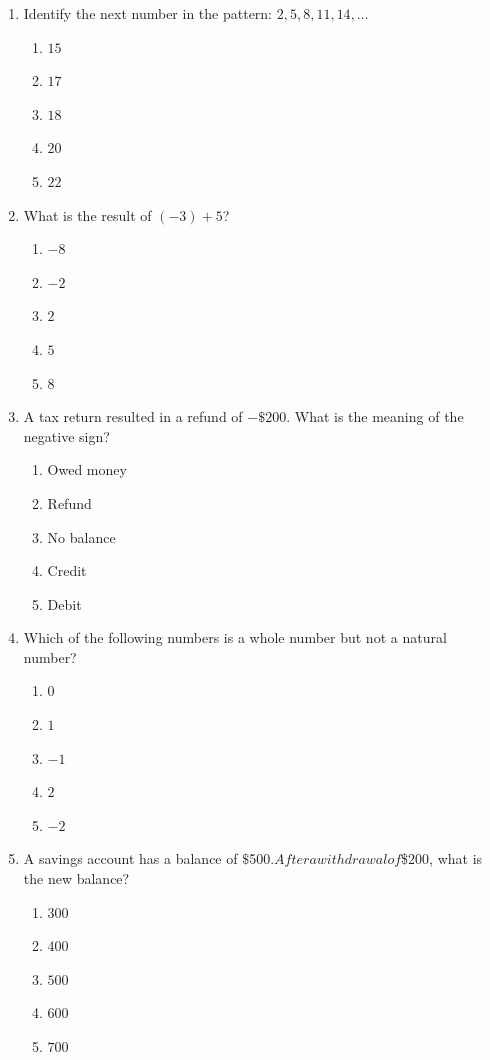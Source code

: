 \documentclass[10pt]{article}
\begin{document}
\begin{multicols}{2}
\begin{enumerate}[label=\textbf{Q\arabic*.}, leftmargin=*, itemsep=6pt, parsep=0pt]
  \item \small Identify the next number in the pattern: $2, 5, 8, 11, 14, \ldots$
  \begin{enumerate}[label=(\Alph*), leftmargin=0.6cm, nosep, itemsep=2pt]
    \item $15$
    \item $17$
    \item $18$
    \item $20$
    \item $22$
  \end{enumerate}

  \item \small What is the result of $(-3) + 5$?
  \begin{enumerate}[label=(\Alph*), leftmargin=0.6cm, nosep, itemsep=2pt]
    \item $-8$
    \item $-2$
    \item $2$
    \item $5$
    \item $8$
  \end{enumerate}

  \item \small A tax return resulted in a refund of $-\$200$. What is the meaning of the negative sign?
  \begin{enumerate}[label=(\Alph*), leftmargin=0.6cm, nosep, itemsep=2pt]
    \item Owed money
    \item Refund
    \item No balance
    \item Credit
    \item Debit
  \end{enumerate}

  \item \small Which of the following numbers is a whole number but not a natural number?
  \begin{enumerate}[label=(\Alph*), leftmargin=0.6cm, nosep, itemsep=2pt]
    \item $0$
    \item $1$
    \item $-1$
    \item $2$
    \item $-2$
  \end{enumerate}

  \item \small A savings account has a balance of $\$$500$. After a withdrawal of $\$$200$, what is the new balance?
  \begin{enumerate}[label=(\Alph*), leftmargin=0.6cm, nosep, itemsep=2pt]
    \item $300$
    \item $400$
    \item $500$
    \item $600$
    \item $700$
  \end{enumerate}

\end{enumerate}
\end{multicols}
\end{document}
